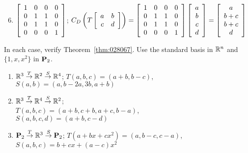 \begin{multicols}{1}
\begin{ex}
\begin{sol}
\begin{enumerate}[label={\alph*.}]
\setcounter{enumi}{5}
\item $\left[ \begin{array}{cccc} 1 & 0 & 0 & 0 \\ 0 & 1 & 1 & 0 \\ 0 & 1 & 1 & 0 \\ 0 & 0 & 0 & 1 \end{array} \right]$; $C_D\left(T\left[ \begin{array}{cc} a & b \\ c & d \end{array} \right]\right) =  \left[ \begin{array}{cccc} 1 & 0 & 0 & 0 \\ 0 & 1 & 1 & 0 \\ 0 & 1 & 1 & 0 \\ 0 & 0 & 0 & 1 \end{array} \right]\left[ \begin{array}{c} a \\ b \\ c \\ d \end{array} \right] = \left[ \begin{array}{c} a \\ b + c \\ b + c \\ d \end{array} \right]$


\end{enumerate}
\end{sol}
\end{ex}

\begin{ex}
In each case, verify Theorem~\ref{thm:028067}. Use the standard basis in $\mathbb{R}^n$ and $\{1, x, x^{2}\}$ in $\textbf{P}_{2}$.


\begin{enumerate}[label={\alph*.}]
\item $\mathbb{R}^3 \stackrel{T}{\to} \mathbb{R}^2 \stackrel{S}{\to} \mathbb{R}^4$; $T(a, b, c) = (a + b, b - c)$, $S(a, b) = (a, b - 2a, 3b, a + b)$


\item $\mathbb{R}^3 \stackrel{T}{\to} \mathbb{R}^4 \stackrel{S}{\to} \mathbb{R}^2$; \\ $T(a, b, c) = (a + b, c + b, a + c, b - a)$, \\ $S(a, b, c, d) = (a + b, c - d)$


\item $\textbf{P}_2 \stackrel{T}{\to} \mathbb{R}^3 \stackrel{S}{\to} \textbf{P}_2$; $T(a + bx + cx^2) = (a, b - c, c - a)$, $S(a, b, c) = b + cx + (a - c)x^2$



\end{enumerate}
\end{ex}
\end{multicols}
